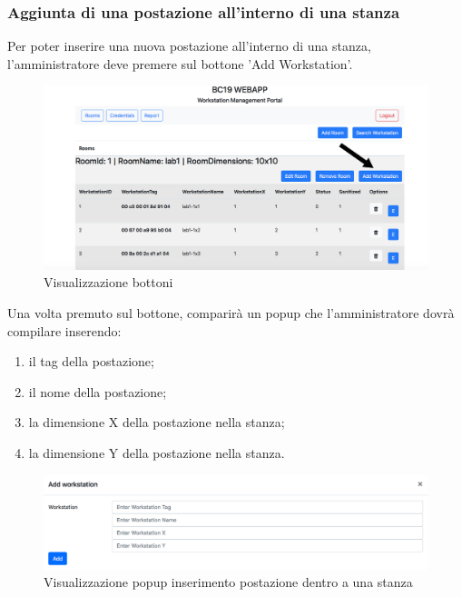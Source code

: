 \subsubsection{Aggiunta di una postazione all'interno di una stanza}
Per poter inserire una nuova postazione all'interno di una stanza, l'amministratore deve premere sul bottone 'Add Workstation'.
\begin{figure}[H]
	\centering
	\includegraphics[width=15cm]{res/images/bottoneAddWorkstation.png}
	\caption{Visualizzazione bottoni}
\end{figure}
Una volta premuto sul bottone, comparirà un popup che l'amministratore dovrà compilare inserendo:
\begin{enumerate}
\item il tag della postazione;
\item il nome della postazione;
\item la dimensione X della postazione nella stanza;
\item la dimensione Y della postazione nella stanza.
\end{enumerate}
\begin{figure}[H]
	\centering
	\includegraphics[width=15cm]{res/images/addWorkstation.png}
	\caption{Visualizzazione popup inserimento postazione dentro a una stanza}
\end{figure}

